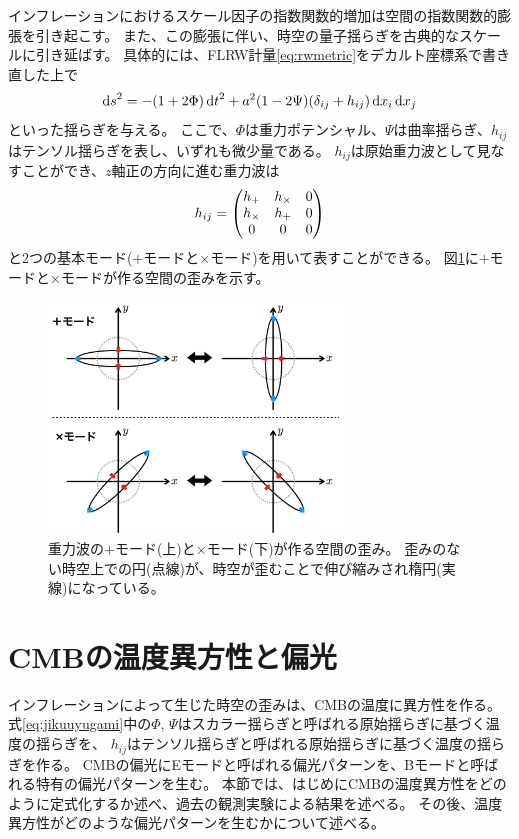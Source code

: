 \documentclass[../../main.tex]{subfiles}
\begin{document}
インフレーションにおけるスケール因子の指数関数的増加は空間の指数関数的膨張を引き起こす。
また、この膨張に伴い、時空の量子揺らぎを古典的なスケールに引き延ばす。
具体的には、FLRW計量\eqref{eq:rwmetric}をデカルト座標系で書き直した上で
\begin{equation}
    \label{eq:jikuuyugami}
    \dd{s}^2 = -\qty(1+2\Phi)\dd{t}^2 + a^2\qty(1-2\Psi)\qty(\delta_{ij}+h_{ij})\dd{x_i}\dd{x_j}
\end{equation}
といった揺らぎを与える。
ここで、$\Phi$は重力ポテンシャル、$\Psi$は曲率揺らぎ、$h_{ij}$はテンソル揺らぎを表し、いずれも微少量である。
$h_{ij}$は原始重力波として見なすことができ、$z$軸正の方向に進む重力波は
\begin{equation}
    h_{ij} = \mqty(h_{+} & h_{\times} & 0\\
                   h_{\times} & h_{+} & 0\\
                   0 & 0 & 0
                   )
\end{equation}
と2つの基本モード($+$モードと$\times$モード)を用いて表すことができる。
図\ref{fig:gravitational_wave}に$+$モードと$\times$モードが作る空間の歪みを示す。
\begin{figure}[H]
    \centering
    \includegraphics[width=0.7\textwidth]{intro/gravitational_wave.pdf}
    \caption{重力波の$+$モード(上)と$\times$モード(下)が作る空間の歪み。
    歪みのない時空上での円(点線)が、時空が歪むことで伸び縮みされ楕円(実線)になっている。}
    \label{fig:gravitational_wave}
\end{figure}

\section{CMBの温度異方性と偏光}
インフレーションによって生じた時空の歪みは、CMBの温度に異方性を作る\cite{1967ApJ...147...73S}。
式\eqref{eq:jikuuyugami}中の$\Phi,\,\Psi$はスカラー揺らぎと呼ばれる原始揺らぎに基づく温度の揺らぎを、
$h_{ij}$はテンソル揺らぎと呼ばれる原始揺らぎに基づく温度の揺らぎを作る。
CMBの偏光にEモードと呼ばれる偏光パターンを、Bモードと呼ばれる特有の偏光パターンを生む。
本節では、はじめにCMBの温度異方性をどのように定式化するか述べ、過去の観測実験による結果を述べる。
その後、温度異方性がどのような偏光パターンを生むかについて述べる。
\end{document}
